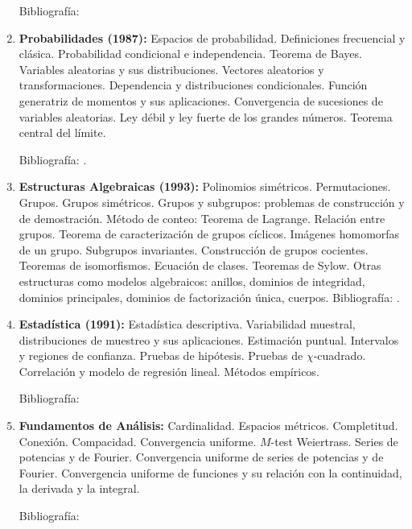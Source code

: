 \documentclass[a4paper, 12pt]{article}
\begin{document}
\begin{enumerate}
 Bibliografía: \cite{golub,hoffman,meyer, strang}


\item \textbf{Probabilidades (1987):} Espacios de probabilidad. Definiciones frecuencial y clásica.   Probabilidad condicional e independencia.  Teorema de Bayes. Variables aleatorias y sus distribuciones.  Vectores aleatorios y transformaciones.  Dependencia y distribuciones condicionales. Función generatriz de momentos y sus aplicaciones. Convergencia de sucesiones de variables aleatorias. Ley débil y ley fuerte de los grandes números. Teorema central del límite. 

Bibliografía: \cite{berts, devore, parzen, ross, grimmet, menden}. 
 

 \item \textbf{Estructuras Algebraicas  (1993):} Polinomios simétricos. Permutaciones. Grupos. Grupos simétricos. Grupos y subgrupos: problemas de construcción y de demostración. Método de conteo: Teorema de Lagrange.  Relación entre grupos.  Teorema de caracterización de grupos cíclicos. Imágenes homomorfas de un grupo. Subgrupos invariantes. Construcción de grupos cocientes. Teoremas de isomorfismos. Ecuación de clases. Teoremas de Sylow. Otras estructuras como modelos algebraicos: anillos, dominios de integridad, dominios principales, dominios de factorización única,  cuerpos. 
Bibliografía: \cite{dorronsoro,obrien, herstein, lang}.





 
 \item \textbf{Estadística (1991):} Estadística descriptiva. Variabilidad muestral, distribuciones de muestreo y sus aplicaciones. Estimación puntual. Intervalos y regiones de confianza. Pruebas de hipótesis. Pruebas de $\chi$-cuadrado. Correlación  y modelo de regresión lineal. Métodos empíricos. 
 

Bibliografía: \cite{wasserman, devore, james, boente, mosche, johnku, triola,menden}
 
\item \textbf{Fundamentos de Análisis:} Cardinalidad. Espacios métricos. Completitud. Conexión. Compacidad. Convergencia uniforme. $M$-test  Weiertrass. Series de potencias y de Fourier. Convergencia uniforme de series de potencias y de Fourier. Convergencia  uniforme de funciones y su relación con la continuidad, la  derivada y la  integral. 

Bibliografía: \cite{RogerGodement658,StephenAbbott134,Simmons671,MichealOSearcoid674,SatishShirali675,VictorBryant676,J.Dieudonne678,WalterRudin681,NikolaosKatzourakis684,VilmosKomornik685,VicenteMontesinos686}






\end{enumerate}
\end{document}
